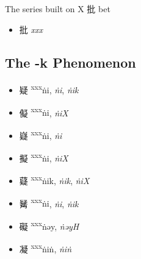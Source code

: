 The series built on X
批 bet
\begin{itemize}\item
{\Large{批}}  \emph{xxx} %
\end{itemize}


\subsection{The -k Phenomenon}

\begin{itemize}

    \item {\Large{疑}} %
    {\large{{\textsuperscript{xxx}ṅi}}},
    \textit{ṅi}, \textit{ṅik}       %

    \item {\Large{儗}} %
    {\large{{\textsuperscript{xxx}ṅi}}},
    \textit{ṅiX}                    %

    \item {\Large{嶷}} %
    {\large{{\textsuperscript{xxx}ṅi}}},
    \textit{ṅi}                     %

    \item {\Large{擬}} %
    {\large{{\textsuperscript{xxx}ṅi}}},
    \textit{ṅiX}                    %

    \item {\Large{薿}} %
    {\large{{\textsuperscript{xxx}ṅik}}},
    \textit{ṅik}, \textit{ṅiX}      %

    \item {\Large{觺}} %
    {\large{{\textsuperscript{xxx}ṅi}}},
    \textit{ṅi}, \textit{ṅik}       %

    \item {\Large{礙}} %
    {\large{{\textsuperscript{xxx}ṅəy}}},
    \textit{ṅəyH}                   %

    \item {\Large{凝}} %
    {\large{{\textsuperscript{xxx}ṅiṅ}}},
    \textit{ṅiṅ}                   %

\end{itemize}


